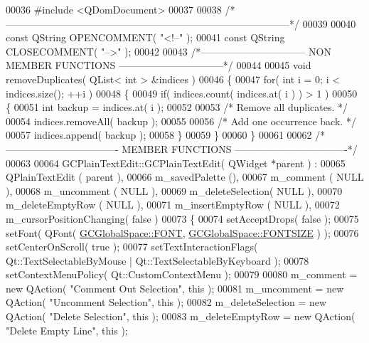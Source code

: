\begin{DoxyCode}
00036 \textcolor{preprocessor}{#include <QDomDocument>}
00037 
00038 \textcolor{comment}{/*
      --------------------------------------------------------------------------------------*/}
00039 
00040 \textcolor{keyword}{const} QString OPENCOMMENT( \textcolor{stringliteral}{"<!--"} );
00041 \textcolor{keyword}{const} QString CLOSECOMMENT( \textcolor{stringliteral}{"-->"} );
00042 
00043 \textcolor{comment}{/*-------------------------------- NON MEMBER FUNCTIONS
       --------------------------------*/}
00044 
00045 \textcolor{keywordtype}{void} removeDuplicates( QList< int > &indices )
00046 \{
00047   \textcolor{keywordflow}{for}( \textcolor{keywordtype}{int} i = 0; i < indices.size(); ++i )
00048   \{
00049     \textcolor{keywordflow}{if}( indices.count( indices.at( i ) ) > 1 )
00050     \{
00051       \textcolor{keywordtype}{int} backup = indices.at( i );
00052 
00053       \textcolor{comment}{/* Remove all duplicates. */}
00054       indices.removeAll( backup );
00055 
00056       \textcolor{comment}{/* Add one occurrence back. */}
00057       indices.append( backup );
00058     \}
00059   \}
00060 \}
00061 
00062 \textcolor{comment}{/*---------------------------------- MEMBER FUNCTIONS
       ----------------------------------*/}
00063 
00064 GCPlainTextEdit::GCPlainTextEdit( QWidget *parent ) :
00065   QPlainTextEdit   ( parent ),
00066   m\_savedPalette   (),
00067   m\_comment        ( NULL ),
00068   m\_uncomment      ( NULL ),
00069   m\_deleteSelection( NULL ),
00070   m\_deleteEmptyRow ( NULL ),
00071   m\_insertEmptyRow ( NULL ),
00072   m\_cursorPositionChanging( false )
00073 \{
00074   setAcceptDrops( \textcolor{keyword}{false} );
00075   setFont( QFont( \hyperlink{namespace_g_c_global_space_a9d7158c8a1dfcc867d85ee6b9c5c4810}{GCGlobalSpace::FONT}, \hyperlink{namespace_g_c_global_space_ab9fa2f10bab070a4f59b7e3ef9166c86}{GCGlobalSpace::FONTSIZE} ) );
00076   setCenterOnScroll( \textcolor{keyword}{true} );
00077   setTextInteractionFlags( Qt::TextSelectableByMouse | 
      Qt::TextSelectableByKeyboard );
00078   setContextMenuPolicy( Qt::CustomContextMenu );
00079 
00080   m\_comment = \textcolor{keyword}{new} QAction( \textcolor{stringliteral}{"Comment Out Selection"}, \textcolor{keyword}{this} );
00081   m\_uncomment = \textcolor{keyword}{new} QAction( \textcolor{stringliteral}{"Uncomment Selection"}, \textcolor{keyword}{this} );
00082   m\_deleteSelection = \textcolor{keyword}{new} QAction( \textcolor{stringliteral}{"Delete Selection"}, \textcolor{keyword}{this} );
00083   m\_deleteEmptyRow = \textcolor{keyword}{new} QAction( \textcolor{stringliteral}{"Delete Empty Line"}, \textcolor{keyword}{this} );

\end{DoxyCode}
